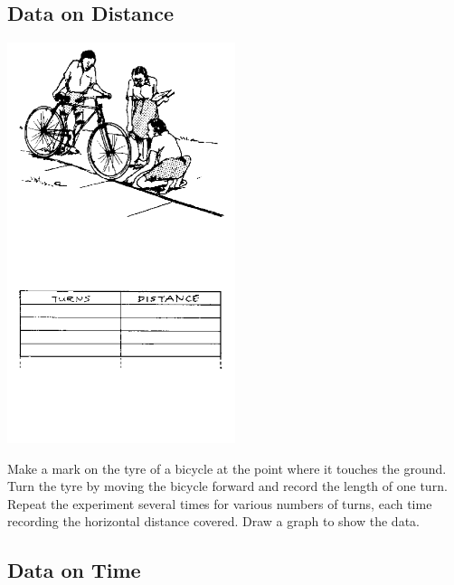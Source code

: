 \begin{multicols}{2}
\vfill
\columnbreak

\subsection{Data on Distance}

\begin{center}
\includegraphics[width=0.5\textwidth]{./img/source/meas-distance.png}
\end{center}

Make a mark on the tyre of a bicycle at the point where it touches the ground. Turn the tyre by moving the bicycle forward and record the length of one turn. Repeat the experiment several times for various numbers of turns, each time recording the horizontal distance covered. Draw a graph to show the data.

\vfill
\columnbreak

\subsection{Data on Time} 


\end{multicols}
